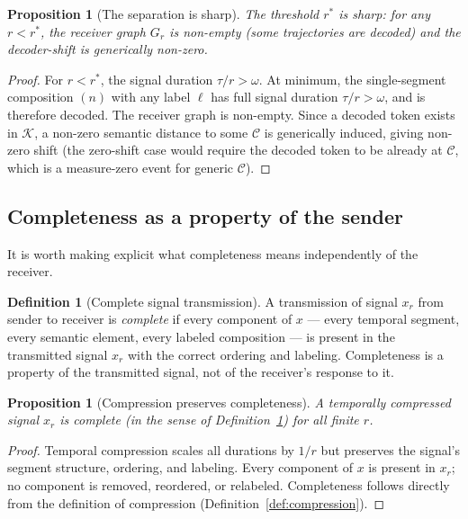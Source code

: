 \documentclass[twocolumn,11pt,a4paper]{article}
\theoremstyle{main}
\newtheorem{proposition}[theorem]{Proposition}
\theoremstyle{definition}
\newtheorem{definition}[theorem]{Definition}
\theoremstyle{remark}
\newcommand{\Know}{\mathcal{K}}
\newcommand{\Cell}{\mathcal{C}}
\newcommand{\rate}{r}
\newcommand{\window}{\omega}
\begin{document}
\begin{proposition}[The separation is sharp]
\label{prop:sharp}
The threshold $\rate^*$ is sharp: for any $\rate < \rate^*$, the
receiver graph $G_r$ is non-empty (some trajectories are decoded) and
the decoder-shift is generically non-zero.
\end{proposition}

\begin{proof}
For $\rate < \rate^*$, the signal duration $\tau/\rate > \window$. At
minimum, the single-segment composition $(n)$ with any label $\ell$ has
full signal duration $\tau/\rate > \window$, and is therefore decoded.
The receiver graph is non-empty. Since a decoded token exists in $\Know$,
a non-zero semantic distance to some $\Cell$ is generically induced,
giving non-zero shift (the zero-shift case would require the decoded
token to be already at $\Cell$, which is a measure-zero event for
generic $\Cell$).
\end{proof}

\subsection{Completeness as a property of the sender}

It is worth making explicit what completeness means independently of the
receiver.

\begin{definition}[Complete signal transmission]
\label{def:complete}
A transmission of signal $x_\rate$ from sender to receiver is
\emph{complete} if every component of $x$ --- every temporal segment,
every semantic element, every labeled composition --- is present in the
transmitted signal $x_\rate$ with the correct ordering and labeling.
Completeness is a property of the transmitted signal, not of the
receiver's response to it.
\end{definition}

\begin{proposition}[Compression preserves completeness]
\label{prop:complete}
A temporally compressed signal $x_\rate$ is complete (in the sense of
Definition~\ref{def:complete}) for all finite $\rate$.
\end{proposition}

\begin{proof}
Temporal compression scales all durations by $1/\rate$ but preserves
the signal's segment structure, ordering, and labeling. Every component
of $x$ is present in $x_\rate$; no component is removed, reordered, or
relabeled. Completeness follows directly from the definition of
compression (Definition~\ref{def:compression}).
\end{proof}
\end{document}
